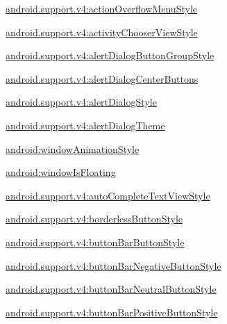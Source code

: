 {\ttfamily \hyperlink{classandroid_1_1support_1_1v4_1_1R_1_1styleable_a409729e91a9f66ebb049d84ae7efa9cc}{android.\+support.\+v4\+:action\+Overflow\+Menu\+Style}}

{\ttfamily \hyperlink{classandroid_1_1support_1_1v4_1_1R_1_1styleable_a52ee8fc4fb3df2bd060e60002e7c3fd2}{android.\+support.\+v4\+:activity\+Chooser\+View\+Style}}

{\ttfamily \hyperlink{classandroid_1_1support_1_1v4_1_1R_1_1styleable_a14ef4f0115ef99be0cd37f57ee57210e}{android.\+support.\+v4\+:alert\+Dialog\+Button\+Group\+Style}}

{\ttfamily \hyperlink{classandroid_1_1support_1_1v4_1_1R_1_1styleable_af89ac865778b38e2eee143370582e60a}{android.\+support.\+v4\+:alert\+Dialog\+Center\+Buttons}}

{\ttfamily \hyperlink{classandroid_1_1support_1_1v4_1_1R_1_1styleable_a7ef5fa1da3e7689dcf99a6e3e7d47d88}{android.\+support.\+v4\+:alert\+Dialog\+Style}}

{\ttfamily \hyperlink{classandroid_1_1support_1_1v4_1_1R_1_1styleable_acb7db297ea9150b5e0877e2de9f24603}{android.\+support.\+v4\+:alert\+Dialog\+Theme}}

{\ttfamily \hyperlink{classandroid_1_1support_1_1v4_1_1R_1_1styleable_aecefaedc85497e957c68a6189e441d7c}{android\+:window\+Animation\+Style}}

{\ttfamily \hyperlink{classandroid_1_1support_1_1v4_1_1R_1_1styleable_a27ce7dec7f28ef2ad9633dddcb3bb204}{android\+:window\+Is\+Floating}}

{\ttfamily \hyperlink{classandroid_1_1support_1_1v4_1_1R_1_1styleable_a7aa1a2971f395765ecd403cc29ee5c95}{android.\+support.\+v4\+:auto\+Complete\+Text\+View\+Style}}

{\ttfamily \hyperlink{classandroid_1_1support_1_1v4_1_1R_1_1styleable_a9ac1a4d55b1bb5250eb7fe7f9c455bfe}{android.\+support.\+v4\+:borderless\+Button\+Style}}

{\ttfamily \hyperlink{classandroid_1_1support_1_1v4_1_1R_1_1styleable_ad50ccb52e962750a3efe3c9332b26ffc}{android.\+support.\+v4\+:button\+Bar\+Button\+Style}}

{\ttfamily \hyperlink{classandroid_1_1support_1_1v4_1_1R_1_1styleable_a82c991e2fa9810fd845a9728c7cea014}{android.\+support.\+v4\+:button\+Bar\+Negative\+Button\+Style}}

{\ttfamily \hyperlink{classandroid_1_1support_1_1v4_1_1R_1_1styleable_aa58b2ce8a1ce16e8e54a6c8b84a6d15c}{android.\+support.\+v4\+:button\+Bar\+Neutral\+Button\+Style}}

{\ttfamily \hyperlink{classandroid_1_1support_1_1v4_1_1R_1_1styleable_a94cd4ce61573e443fe4e9bb2a2d8e7c7}{android.\+support.\+v4\+:button\+Bar\+Positive\+Button\+Style}}

